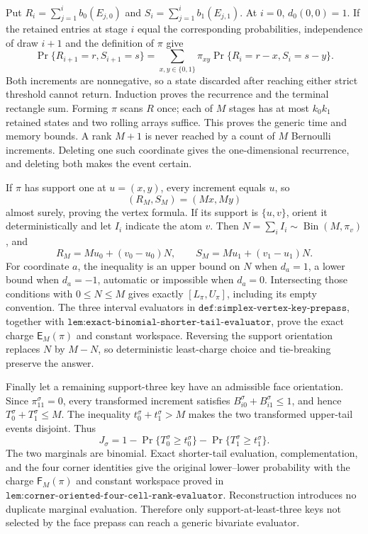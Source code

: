 Put \(R_i=\sum_{j=1}^i b_0(E_{j,0})\) and \(S_i=\sum_{j=1}^i b_1(E_{j,1})\). At \(i=0\), \(d_0(0,0)=1\). If the retained entries at stage \(i\) equal the corresponding probabilities, independence of draw \(i+1\) and the definition of \(\pi\) give
\[
\Pr\{R_{i+1}=r,S_{i+1}=s\}
=\sum_{x,y\in\{0,1\}}\pi_{xy}
 \Pr\{R_i=r-x,S_i=s-y\}.
\tag{1}
\]
Both increments are nonnegative, so a state discarded after reaching either strict threshold cannot return. Induction proves the recurrence and the terminal rectangle sum. Forming \(\pi\) scans \(R\) once; each of \(M\) stages has at most \(k_0k_1\) retained states and two rolling arrays suffice. This proves the generic time and memory bounds. A rank \(M+1\) is never reached by a count of \(M\) Bernoulli increments. Deleting one such coordinate gives the one-dimensional recurrence, and deleting both makes the event certain.

If \(\pi\) has support one at \(u=(x,y)\), every increment equals \(u\), so
\[
(R_M,S_M)=(Mx,My)
\]
almost surely, proving the vertex formula. If its support is \(\{u,v\}\), orient it deterministically and let \(I_i\) indicate the atom \(v\). Then
\(N=\sum_i I_i\sim\operatorname{Bin}(M,\pi_v)\), and
\[
R_M=Mu_0+(v_0-u_0)N,\qquad
S_M=Mu_1+(v_1-u_1)N.
\tag{2}
\]
For coordinate \(a\), the inequality is an upper bound on \(N\) when
\(d_a=1\), a lower bound when \(d_a=-1\), automatic or impossible when
\(d_a=0\). Intersecting those conditions with \(0\le N\le M\) gives exactly
\([L_\pi,U_\pi]\), including its empty convention. The three interval evaluators in
\(\texttt{def:simplex-vertex-key-prepass}\), together with
\(\texttt{lem:exact-binomial-shorter-tail-evaluator}\), prove the exact charge
\(\mathsf E_M(\pi)\) and constant workspace. Reversing the support orientation replaces \(N\) by \(M-N\), so deterministic least-charge choice and tie-breaking preserve the answer.

Finally let a remaining support-three key have an admissible face orientation. Since \(\pi^\sigma_{11}=0\), every transformed increment satisfies \(B_{i0}^\sigma+B_{i1}^\sigma\le1\), and hence
\(T_0^\sigma+T_1^\sigma\le M\). The inequality
\(t_0^\sigma+t_1^\sigma>M\) makes the two transformed upper-tail events disjoint. Thus
\[
J_\sigma=1-\Pr\{T_0^\sigma\ge t_0^\sigma\}
-\Pr\{T_1^\sigma\ge t_1^\sigma\}.
\tag{3}
\]
The two marginals are binomial. Exact shorter-tail evaluation, complementation, and the four corner identities give the original lower--lower probability with the charge \(\mathsf F_M(\pi)\) and constant workspace proved in
\(\texttt{lem:corner-oriented-four-cell-rank-evaluator}\). Reconstruction introduces no duplicate marginal evaluation. Therefore only support-at-least-three keys not selected by the face prepass can reach a generic bivariate evaluator.